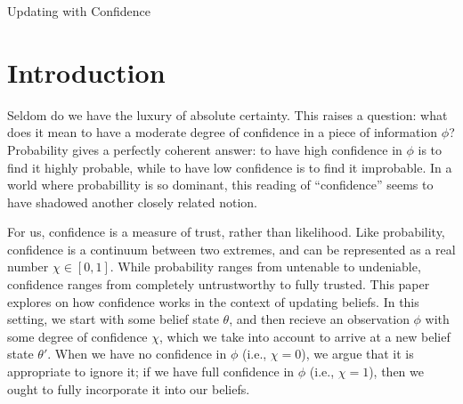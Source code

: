 \documentclass{article}
\begin{document}
\begin{center}
	\Huge 
	Updating with Confidence
\end{center}

\section{Introduction}
\def\stmt{\phi}


Seldom do we have the luxury of absolute certainty.
This raises a question: what does it mean to have a moderate degree of confidence in
	a piece of information $\stmt$? 
Probability gives a perfectly coherent answer: to have high confidence in $\stmt$ is to find it highly probable, while to have low confidence is to find it improbable. 
In a world where probabillity is so dominant, this reading of ``confidence'' seems to have shadowed another closely related notion.


For us, confidence is a measure of trust, rather than likelihood. 
Like probability, confidence is a continuum between two extremes, and can be represented as a real number $\chi \in [0,1]$. 
While probability ranges from untenable to undeniable,
confidence ranges from completely untrustworthy to fully trusted. 
%
This paper explores on how confidence works in the context of updating beliefs.
In this setting, we start with some belief state $\theta$, and then recieve an observation $\stmt$ with some degree of confidence $\chi$, which we take into account to arrive at a new belief state $\theta'$.
When we have no confidence in $\stmt$ (i.e., $\chi=0$), we argue that it is appropriate to ignore it; if we have full confidence in $\stmt$ (i.e., $\chi=1$), then we ought to fully incorporate it into our beliefs. 
\end{document}
